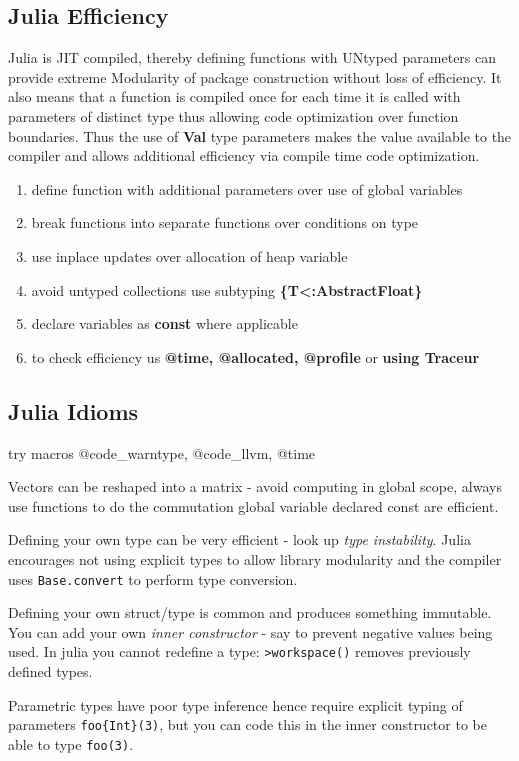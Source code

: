  \subsection{Julia Efficiency}
 Julia is JIT compiled, thereby  defining functions with UNtyped parameters can  provide extreme Modularity of package construction without loss of efficiency. It also means that a function is compiled once for each time it is called with parameters of distinct type thus allowing code optimization over function boundaries. Thus the use of {\bf Val} type parameters makes the value available to the compiler and allows additional efficiency via compile time code optimization.
 \begin{enumerate}
 \item define function with additional parameters over use of global variables
 \item break functions into separate functions over conditions on type
 \item use inplace updates over allocation of heap variable 
 \item avoid untyped collections use subtyping {\bf \{T<:AbstractFloat\}}
 \item declare variables as {\bf const} where applicable
 \item to check efficiency us {\bf @time, @allocated, @profile} or {\bf using Traceur}
 \end{enumerate}
 
 \subsection{Julia Idioms}
 
 try macros @code\_warntype, @code\_llvm, @time 
 
 Vectors can be reshaped into a matrix - avoid computing in global scope, always use functions to do the commutation global variable declared const are efficient.
 
 Defining your own type can be very efficient - look up \emph{type instability}. Julia encourages not using explicit types to allow library modularity and the compiler uses \verb|Base.convert| to perform type conversion. 
 
 Defining your own struct/type is common and produces something immutable. You can add your own \emph{inner constructor} - say  to prevent negative values being used. 
 In julia you cannot redefine a type: \verb|>workspace()| removes previously defined types.
 
 Parametric types have poor type inference hence require explicit typing of parameters \verb|foo{Int}(3)|,  but you can code this in the inner constructor to be able to type \verb|foo(3)|.
 
